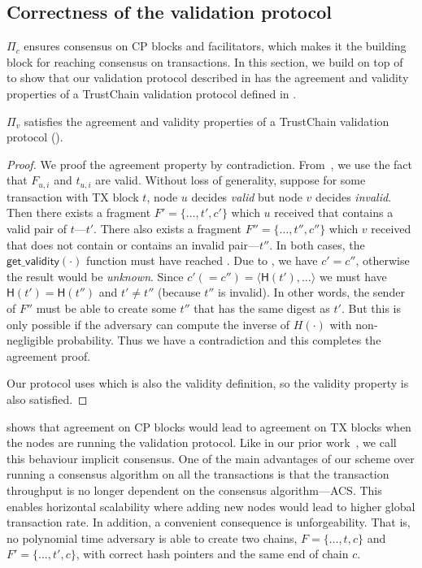 \subsection{Correctness of the validation protocol}
 $\Pi_c$ ensures consensus on CP blocks and facilitators,
which makes it the building block for reaching consensus on transactions.
In this section, we build on top of  to show that our validation protocol described in  has the agreement and validity properties of a TrustChain validation protocol defined in .

\begin{theorem}
\label{theorem:validation-agreement}
$\Pi_v$ satisfies the agreement and validity properties of a TrustChain validation protocol ().
\end{theorem}
\begin{proof}
We proof the agreement property by contradiction.
From~,
we use the fact that $F_{u, i}$ and $t_{u, i}$ are valid.
Without loss of generality, suppose for some transaction with TX block $t$,
node $u$ decides \emph{valid} but node $v$ decides \emph{invalid}.
Then there exists a fragment $F' = \{ \dots, t', c'\}$ which $u$ received that contains a valid pair of $t$---$t'$.
There also exists a fragment $F'' = \{ \dots, t'', c''\}$ which $v$ received that does not contain or contains an invalid pair---$t''$.
In both cases, the $\textsf{get\_validity}(\cdot)$ function must have reached .
Due to , we have $c' = c''$, otherwise the result would be \emph{unknown}.
Since $c' (= c'') = \langle \textsf{H}(t'), \dots \rangle$ we must have $\textsf{H}(t') = \textsf{H}(t'')$ and $t' \ne t''$ (because $t''$ is invalid).
In other words, the sender of $F''$ must be able to create some $t''$ that has the same digest as $t'$.
But this is only possible if the adversary can compute the inverse of $H(\cdot)$ with non-negligible probability.
Thus we have a contradiction and this completes the agreement proof.

Our protocol uses  which is also the validity definition,
so the validity property is also satisfied.
\end{proof}

 shows that agreement on CP blocks would lead to agreement on TX blocks when the nodes are running the validation protocol.
Like in our prior work~\cite{implicitconsensus}, we call this behaviour implicit consensus.
One of the main advantages of our scheme over running a consensus algorithm on all the transactions is that 
the transaction throughput is no longer dependent on the consensus algorithm---ACS.
This enables horizontal scalability where adding new nodes would lead to higher global transaction rate.
In addition, a convenient consequence  is unforgeability.
That is, no polynomial time adversary is able to create two chains, $F = \{ \dots, t, c\}$ and $F' = \{ \dots, t', c\}$, with correct hash pointers and the same end of chain $c$.

